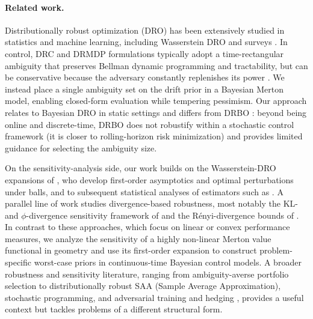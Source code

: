 \documentclass[11pt]{article}
\theoremstyle{definition}
\begin{document}
\paragraph{Related work.} Distributionally robust optimization (DRO) has been extensively studied in statistics and machine learning, including Wasserstein DRO \cite{Blanchet2021WassersteinDRO,Blanchet2024DRO} and surveys \cite{rahimian2019distributionally,Bayraksan2015,ksw_2024_dro}. In control, DRC and DRMDP formulations typically adopt a time-rectangular ambiguity that preserves Bellman dynamic programming and tractability, but can be conservative because the adversary constantly replenishes its power  \cite{HansenSargent2001,hansen2008robustness,wkr_2013_rmdp,RB1,RB2,NianSi,wang2022policy,Wang2023,Liu2022,Zhou2021,lu2024drrl}. We instead place a single ambiguity set on the drift prior in a Bayesian Merton model, enabling closed-form evaluation while tempering pessimism. Our approach relates to Bayesian DRO in static settings \cite{doi:10.1137/21M1465548} and differs from DRBO \cite{pmlr-v108-kirschner20a}: beyond being online and discrete-time, DRBO does not robustify within a stochastic control framework (it is closer to rolling-horizon risk minimization) and provides limited guidance for selecting the ambiguity size.

On the sensitivity-analysis side, our work builds on the Wasserstein-DRO expansions of \cite{BartlDrapeauOblojWiesel2021}, who develop first-order asymptotics and optimal perturbations under  balls, and to subsequent statistical analyses of  estimators such as \cite{BKW19, Blanchet2021WassersteinDRO, BMZ21}. A parallel line of work studies divergence-based robustness, most notably the KL- and $\phi$-divergence sensitivity framework of \cite{Lam2016} and the Rényi-divergence bounds of \cite{AtarChowdharyDupuis2015}. In contrast to these approaches, which focus on linear or convex performance measures, we analyze the sensitivity of a highly non-linear Merton value functional in  geometry and use its first-order expansion to construct problem-specific worst-case priors in continuous-time Bayesian control models. A broader robustness and sensitivity literature, ranging from ambiguity-averse portfolio selection \cite{PflugWozabal2007} to distributionally robust SAA {(Sample Average Approximation)}, stochastic programming, and adversarial training and hedging \cite{AndersonPhilpott2019, Dupacova1990, BonnansShapiro2013, ArmacostFiacco1974, AraujoEtAl2019, GaoKleywegt2016, sauldubois_touzi_2024}, provides a useful context but tackles problems of a different structural form.
\end{document}
